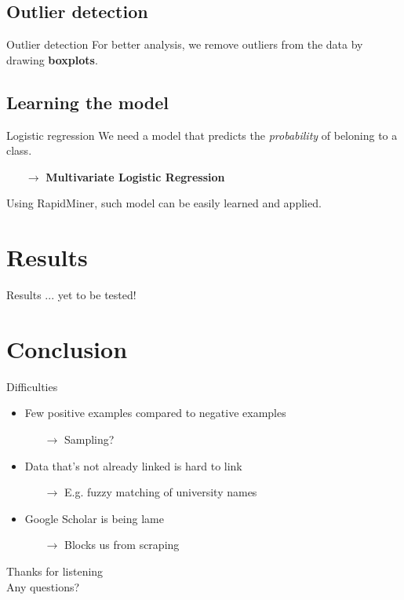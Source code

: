 \documentclass[nonav,sleutel]{beamer}
\begin{document}
\subsection{Outlier detection}
\begin{frame}{Outlier detection}
For better analysis, we remove outliers from the data by drawing \textbf{boxplots}.
\end{frame}


\subsection{Learning the model}

\begin{frame}{Logistic regression}
We need a model that predicts the \emph{probability} of beloning to a class.\\[.5cm]
	\pause
	\begin{itemize}
		\item[$\rightarrow$] \textbf{Multivariate Logistic Regression}
	\end{itemize}
\vspace{.5cm}
Using RapidMiner, such model can be easily learned and applied. 
\end{frame}

\section{Results}

\begin{frame}{Results}
... yet to be tested!\\[.5cm]
	
\end{frame}

\section{Conclusion}

\begin{frame}{Difficulties}
\begin{itemize}
	\item Few positive examples compared to negative examples
		\begin{itemize}
			\item[$\rightarrow$] Sampling?
		\end{itemize}
	\item Data that's not already linked is hard to link
		\begin{itemize}
			\item[$\rightarrow$] E.g. fuzzy matching of university names
		\end{itemize}
	\item Google Scholar is being lame
		\begin{itemize}
			\item[$\rightarrow$] Blocks us from scraping
		\end{itemize}
\end{itemize}
\end{frame}

\begin{frame}
\begin{center}
\Large{Thanks for listening}\\
Any questions?
\end{center}

\end{frame}
\end{document}
